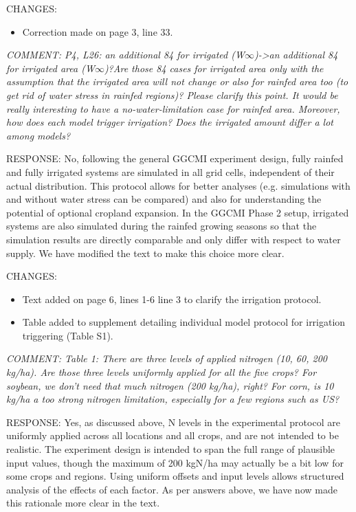 \documentclass[gmd, manuscript]{copernicus} %
\begin{document}
CHANGES:
\begin{itemize}
    \item Correction made on page 3, line 33.
\end{itemize}

\smallskip

\textcolor{dark-gray}{\textit{COMMENT: P4, L26: an additional 84 for irrigated (W$\infty$)->an additional 84 for irrigated area (W$\infty$)?Are those 84 cases for irrigated area only with the assumption that the irrigated area will not change or also for rainfed area too (to get rid of water stress in rainfed regions)? Please clarify this point. It would be really interesting to have a no-water-limitation case for rainfed area. Moreover, how does each model trigger irrigation? Does the irrigated amount differ a lot among models?}}

RESPONSE: No, following the general GGCMI experiment design, fully rainfed and fully irrigated systems are simulated in all grid cells, independent of their actual distribution. This protocol allows for better analyses (e.g. simulations with and without water stress can be compared) and also for understanding the potential of optional cropland expansion. In the GGCMI Phase 2 setup, irrigated systems are also simulated during the rainfed growing seasons so that the simulation results are directly comparable and only differ with respect to water supply. We have modified the text to make this choice more clear.
\smallskip

CHANGES:
\begin{itemize}
    \item Text added on page 6, lines 1-6 line 3 to clarify the irrigation protocol.
    \item Table added to supplement detailing individual model protocol for irrigation triggering (Table S1).
\end{itemize}

\smallskip

\textcolor{dark-gray}{\textit{COMMENT: Table 1: There are three levels of applied nitrogen (10, 60, 200 kg/ha). Are those three levels uniformly applied for all the five crops? For soybean, we don’t need that much nitrogen (200 kg/ha), right? For corn, is 10 kg/ha a too strong nitrogen limitation, especially for a few regions such as US?}}

RESPONSE: Yes, as discussed above, N levels in the experimental protocol are uniformly applied across all locations and all crops, and are not intended to be realistic. The experiment design is intended to span the full range of plausible input values, though the maximum of 200 kgN/ha may actually be a bit low for some crops and regions. Using uniform offsets and input levels allows structured analysis of the effects of each factor. As per answers above, we have now made this rationale more clear in the text.
\smallskip
\end{document}
